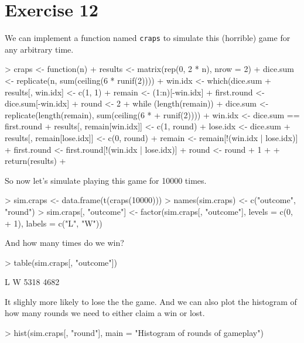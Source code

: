 \documentclass{article}
\begin{document}
\section{Exercise 12}
We can implement a function named \verb=craps= to simulate this (horrible) game for any arbitrary time. 
\begin{Schunk}
\begin{Sinput}
> craps <- function(n) {
+     results <- matrix(rep(0, 2 * n), nrow = 2)
+     dice.sum <- replicate(n, sum(ceiling(6 * runif(2))))
+     win.idx <- which(dice.sum %in% c(7, 11))
+     results[, win.idx] <- c(1, 1)
+     remain <- (1:n)[-win.idx]
+     first.round <- dice.sum[-win.idx]
+     round <- 2
+     while (length(remain)) {
+         dice.sum <- replicate(length(remain), sum(ceiling(6 * 
+             runif(2))))
+         win.idx <- dice.sum == first.round
+         results[, remain[win.idx]] <- c(1, round)
+         lose.idx <- dice.sum %in% c(7, 11)
+         results[, remain[lose.idx]] <- c(0, round)
+         remain <- remain[!(win.idx | lose.idx)]
+         first.round <- first.round[!(win.idx | lose.idx)]
+         round <- round + 1
+     }
+     return(results)
+ }
\end{Sinput}
\end{Schunk}

So now let's simulate playing this game for 10000 times.
\begin{Schunk}
\begin{Sinput}
> sim.craps <- data.frame(t(craps(10000)))
> names(sim.craps) <- c("outcome", "round")
> sim.craps[, "outcome"] <- factor(sim.craps[, "outcome"], levels = c(0, 
+     1), labels = c("L", "W"))
\end{Sinput}
\end{Schunk}
And how many times do we win?
\begin{Schunk}
\begin{Sinput}
> table(sim.craps[, "outcome"])
\end{Sinput}
\begin{Soutput}
   L    W 
5318 4682 
\end{Soutput}
\end{Schunk}
It slighly more likely to lose the the game. And we can also plot the histogram of how many rounds we need to either claim a win or lost.
\begin{Schunk}
\begin{Sinput}
> hist(sim.craps[, "round"], main = "Histogram of rounds of gameplay")
\end{Sinput}
\end{Schunk}
\end{document}
